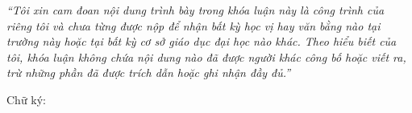 
\textit{\enquote{Tôi xin cam đoan nội dung trình bày trong khóa luận này là công trình của riêng tôi và chưa từng được nộp để nhận bất kỳ học vị hay văn bằng nào tại trường này hoặc tại bất kỳ cơ sở giáo dục đại học nào khác. Theo hiểu biết của tôi, khóa luận không chứa nội dung nào đã được người khác công bố hoặc viết ra, trừ những phần đã được trích dẫn hoặc ghi nhận đầy đủ.}}

\vspace{1.5cm}
Chữ ký:\makebox[3.2in]{\dotfill}
